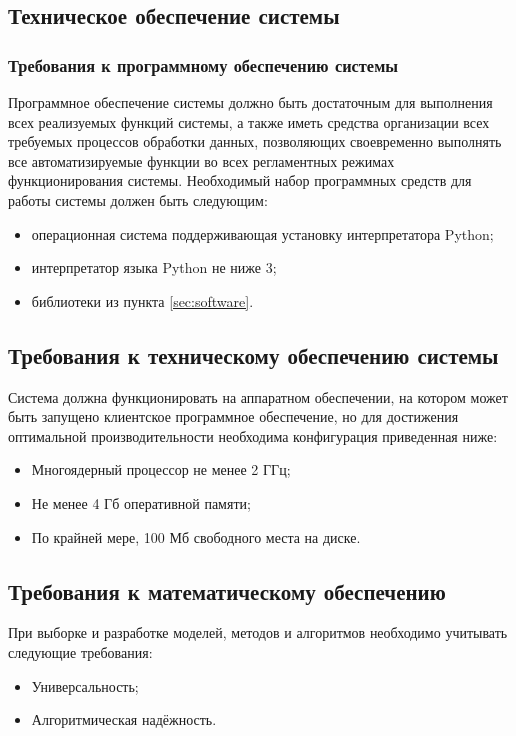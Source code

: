 \subsection{Техническое обеспечение системы}
\subsubsection{Требования к программному обеспечению системы}
Программное обеспечение системы должно быть достаточным для выполнения всех реализуемых функций системы, а 
также иметь средства организации всех требуемых процессов обработки данных, позволяющих своевременно 
выполнять все автоматизируемые функции во всех регламентных режимах функционирования системы. Необходимый 
набор программных средств для работы системы должен быть следующим:
\begin{itemize}
    \item операционная система поддерживающая установку интерпретатора Python;
    \item интерпретатор языка Python не ниже 3;
    \item библиотеки из пункта \ref{sec:software}.
\end{itemize}

\subsection{Требования к техническому обеспечению системы}
Система должна функционировать на аппаратном обеспечении, на котором может быть запущено клиентское 
программное обеспечение, но для достижения оптимальной производительности необходима конфигурация приведенная 
ниже:
\begin{itemize}
    \item Многоядерный процессор не менее 2 ГГц;
    \item Не менее 4 Гб оперативной памяти;
    \item По крайней мере, 100 Мб свободного места на диске.
\end{itemize}

\subsection{Требования к математическому обеспечению}
При выборке и разработке моделей, методов и алгоритмов необходимо учитывать следующие требования:
\begin{itemize}
    \item Универсальность;
    \item Алгоритмическая надёжность.
\end{itemize}


